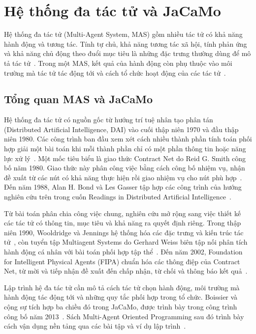 \documentclass[12pt,a4paper,oneside]{extreport}
\begin{document}
\section{Hệ thống đa tác tử và JaCaMo}\label{sec:1-3}

Hệ thống đa tác tử (Multi-Agent System, MAS) gồm nhiều tác tử có khả năng hành động và tương tác. Tính tự chủ, khả năng tương tác xã hội, tính phản ứng và khả năng chủ động theo đuổi mục tiêu là những đặc trưng thường dùng để mô tả tác tử~\cite{ref-1}. Trong một MAS, kết quả của hành động còn phụ thuộc vào môi trường mà tác tử tác động tới và cách tổ chức hoạt động của các tác tử~\cite{ref-2}.

\subsection{Tổng quan MAS và JaCaMo}\label{sec:1-3-1}

Hệ thống đa tác tử có nguồn gốc từ hướng trí tuệ nhân tạo phân tán (Distributed Artificial Intelligence, DAI) vào cuối thập niên 1970 và đầu thập niên 1980. Các công trình ban đầu xem xét cách nhiều thành phần tính toán phối hợp giải một bài toán khi mỗi thành phần chỉ có một phần thông tin hoặc năng lực xử lý~\cite{ref-32}. Một mốc tiêu biểu là giao thức Contract Net do Reid G. Smith công bố năm 1980. Giao thức này phân công việc bằng cách công bố nhiệm vụ, nhận đề xuất từ các nút có khả năng thực hiện rồi giao nhiệm vụ cho nút phù hợp~\cite{ref-33}. Đến năm 1988, Alan H. Bond và Les Gasser tập hợp các công trình của hướng nghiên cứu trên trong cuốn Readings in Distributed Artificial Intelligence~\cite{ref-32}.

Từ bài toán phân chia công việc chung, nghiên cứu mở rộng sang việc thiết kế các tác tử có thông tin, mục tiêu và khả năng ra quyết định riêng. Trong thập niên 1990, Wooldridge và Jennings hệ thống hóa các đặc trưng và kiến trúc tác tử~\cite{ref-1}, còn tuyển tập Multiagent Systems do Gerhard Weiss biên tập nối phân tích hành động cá nhân với bài toán phối hợp tập thể~\cite{ref-34}. Đến năm 2002, Foundation for Intelligent Physical Agents (FIPA) chuẩn hóa các thông điệp của Contract Net, từ mời và tiếp nhận đề xuất đến chấp nhận, từ chối và thông báo kết quả~\cite{ref-35}.

Lập trình hệ đa tác tử cần mô tả cách tác tử chọn hành động, môi trường mà hành động tác động tới và những quy tắc phối hợp trong tổ chức. Boissier và cộng sự tích hợp ba chiều đó trong JaCaMo, được trình bày trong công trình công bố năm 2013~\cite{ref-2}. Sách Multi-Agent Oriented Programming sau đó trình bày cách vận dụng nền tảng qua các bài tập và ví dụ lập trình~\cite{ref-36}.
\end{document}
